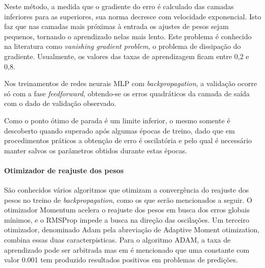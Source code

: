             \begin{figure}[ht]
            \end{figure}
            
            Neste método, a medida que o gradiente do erro é calculado das camadas inferiores para as superiores, sua norma  decresce com velocidade exponencial. Isto faz que nas camadas mais próximas à entrada os ajustes de pesos  sejam pequenos, tornando o aprendizado nelas  mais lento. Este problema é conhecido na literatura como \textit{vanishing gradient problem}, o problema de dissipação do gradiente.   Usualmente, os valores das taxas de aprendizagem ficam entre 0,2 e 0,8.
            
            Nos treinamentos de redes neurais MLP com \textit{backpropagation}, a validação ocorre só com a fase \textit{feedforward}, obtendo-se os erros quadráticos da camada de saída com o dado de validação observado. 
            
            Como o ponto ótimo de parada é um limite inferior, o mesmo somente é descoberto quando superado após algumas épocas de treino, dado que em procedimentos práticos a obtenção de erro é oscilatória e pelo qual é necessário manter salvos os parâmetros obtidos durante estas épocas.
            
            \paragraph{Otimizador de reajuste dos pesos} São conhecidos vários algoritmos que otimizam a convergência do reajuste dos pesos no treino de \textit{backpropagation}, como os que serão mencionados a seguir. O otimizador Momentum acelera o reajuste dos pesos em busca dos erros globais mínimos, e o RMSProp impede a busca na direção das oscilações. Um terceiro otimizador, denominado Adam pela abreviação de Adaptive Moment otimization, combina essas duas caracterpisticas. Para o algoritmo ADAM, a taxa de aprendizado pode ser arbitrada mas em  é mencionado que uma constante com valor 0.001 tem produzido resultados positivos em problemas de predições.  
            

